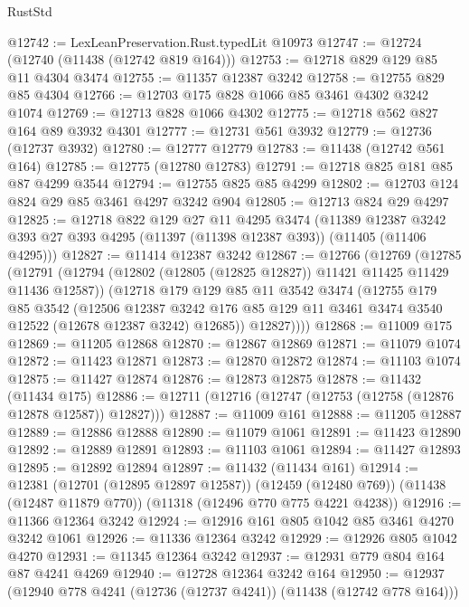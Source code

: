 \begin{lexlean}{RustStd}
\begin{coremodule}
@12742 := LexLeanPreservation.Rust.typedLit @10973
@12747 := @12724 (@12740 (@11438 (@12742 @819 @164)))
@12753 := @12718 @829 @129 @85 @11 @4304 @3474
@12755 := @11357 @12387 @3242
@12758 := @12755 @829 @85 @4304
@12766 := @12703 @175 @828 @1066 @85 @3461 @4302 @3242 @1074
@12769 := @12713 @828 @1066 @4302
@12775 := @12718 @562 @827 @164 @89 @3932 @4301
@12777 := @12731 @561 @3932
@12779 := @12736 (@12737 @3932)
@12780 := @12777 @12779
@12783 := @11438 (@12742 @561 @164)
@12785 := @12775 (@12780 @12783)
@12791 := @12718 @825 @181 @85 @87 @4299 @3544
@12794 := @12755 @825 @85 @4299
@12802 := @12703 @124 @824 @29 @85 @3461 @4297 @3242 @904
@12805 := @12713 @824 @29 @4297
@12825 := @12718
    @822
    @129
    @27
    @11
    @4295
    @3474
    (@11389 @12387 @3242 @393 @27 @393 @4295 (@11397 (@11398 @12387 @393)) (@11405 (@11406 @4295)))
@12827 := @11414 @12387 @3242
@12867 := @12766
    (@12769
      (@12785
        (@12791
          (@12794 (@12802 (@12805 (@12825 @12827)) @11421 @11425 @11429 @11436 @12587))
          (@12718
            @179
            @129
            @85
            @11
            @3542
            @3474
            (@12755
              @179
              @85
              @3542
              (@12506
                @12387
                @3242
                @176
                @85
                @129
                @11
                @3461
                @3474
                @3540
                @12522
                (@12678 @12387 @3242)
                @12685))
            @12827))))
@12868 := @11009 @175
@12869 := @11205 @12868
@12870 := @12867 @12869
@12871 := @11079 @1074
@12872 := @11423 @12871
@12873 := @12870 @12872
@12874 := @11103 @1074
@12875 := @11427 @12874
@12876 := @12873 @12875
@12878 := @11432 (@11434 @175)
@12886 := @12711 (@12716 (@12747 (@12753 (@12758 (@12876 @12878 @12587)) @12827)))
@12887 := @11009 @161
@12888 := @11205 @12887
@12889 := @12886 @12888
@12890 := @11079 @1061
@12891 := @11423 @12890
@12892 := @12889 @12891
@12893 := @11103 @1061
@12894 := @11427 @12893
@12895 := @12892 @12894
@12897 := @11432 (@11434 @161)
@12914 := @12381
    (@12701 (@12895 @12897 @12587))
    (@12459 (@12480 @769))
    (@11438 (@12487 @11879 @770))
    (@11318 (@12496 @770 @775 @4221 @4238))
@12916 := @11366 @12364 @3242
@12924 := @12916 @161 @805 @1042 @85 @3461 @4270 @3242 @1061
@12926 := @11336 @12364 @3242
@12929 := @12926 @805 @1042 @4270
@12931 := @11345 @12364 @3242
@12937 := @12931 @779 @804 @164 @87 @4241 @4269
@12940 := @12728 @12364 @3242 @164
@12950 := @12937 (@12940 @778 @4241 (@12736 (@12737 @4241)) (@11438 (@12742 @778 @164)))

\end{coremodule}
\end{lexlean}

